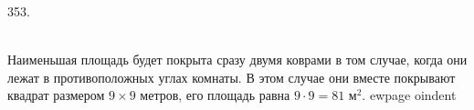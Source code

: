 353. \begin{figure}[ht!]
\end{figure}\\
Наименьшая площадь будет покрыта сразу двумя коврами в том случае, когда они лежат в противоположных углах комнаты. В этом случае они вместе покрывают квадрат размером $9\times9$ метров, его площадь равна $9\cdot9=81\text{ м}^2.$
ewpage
oindent

